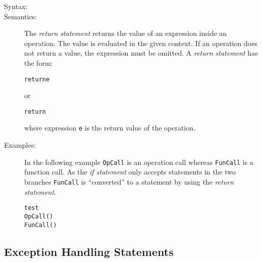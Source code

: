\documentclass[\pformat,12pt]{article}
\begin{document}
\begin{description}
\item[Syntax:]


\item[Semantics:] The {\it return statement} returns the value of an
  expression inside an operation. The value is evaluated in the given
  context. If an operation does not return a value, the expression must be
  omitted. A {\it return statement\/} has the form:
  \begin{alltt}
    return e
  \end{alltt}
  or
  \begin{alltt}
    return
  \end{alltt}
  where expression {\tt e} is the return value of the operation.

\item[Examples:] In the following example {\tt OpCall} is an operation call
  whereas {\tt FunCall} is a function call. As the {\it if statement\/}
  only accepts statements in the two branches {\tt FunCall} is
  ``converted'' to a statement by using the {\it return statement}.
  \begin{alltt}
     test
     OpCall()
      FunCall()
  \end{alltt}

\end{description}

\subsection{Exception Handling Statements}
\end{document}
